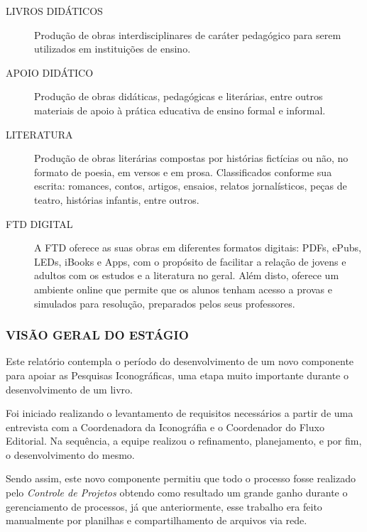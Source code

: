 \documentclass[
  12pt,            %
  openany,
  oneside,
  a4paper,         %
  english,      %
  brazil
]{article}
\numberwithin{figure}{section}
\numberwithin{table}{section}
\begin{document}
\begin{description}
  \item[LIVROS DIDÁTICOS] Produção de obras interdisciplinares de caráter pedagógico para serem utilizados em instituições de ensino.
  \item[APOIO DIDÁTICO]   Produção de obras didáticas, pedagógicas e literárias, entre outros materiais de apoio à prática educativa de ensino formal e informal.
  \item[LITERATURA]       Produção de obras literárias compostas por histórias fictícias ou não, no formato de poesia, em versos e em prosa. Classificados conforme sua escrita: romances, contos, artigos, ensaios, relatos jornalísticos, peças de teatro, histórias infantis, entre outros.
  \item[FTD DIGITAL]      A FTD oferece as suas obras em diferentes formatos digitais: PDFs, ePubs, LEDs, iBooks e Apps, com o propósito de facilitar a relação de jovens e adultos com os estudos e a literatura no geral. Além disto, oferece um ambiente online que permite que os alunos tenham acesso a provas e simulados para resolução, preparados pelos seus professores.
\end{description}


\subsubsection{VISÃO GERAL DO ESTÁGIO}

Este relatório contempla o período do desenvolvimento de um novo componente para apoiar as Pesquisas Iconográficas, uma etapa muito importante durante o desenvolvimento de um livro.

Foi iniciado realizando o levantamento de requisitos necessários a partir de uma entrevista com a Coordenadora da Iconográfia e o Coordenador do Fluxo Editorial. Na sequência, a equipe realizou o refinamento, planejamento, e por fim, o desenvolvimento do mesmo.

Sendo assim, este novo componente permitiu que todo o processo fosse realizado pelo \textit{Controle de Projetos} obtendo como resultado um grande ganho durante o gerenciamento de processos, já que anteriormente, esse trabalho era feito manualmente por planilhas e compartilhamento de arquivos via rede.


%
%
%
%
%
%
\end{document}
